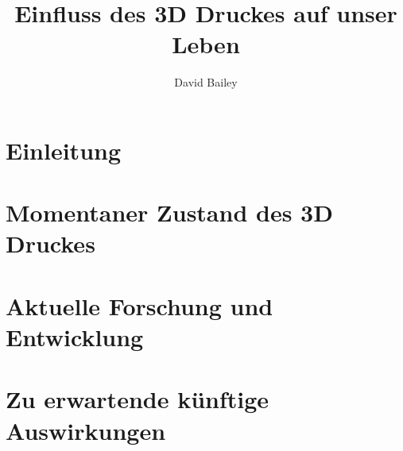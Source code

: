\documentclass[11pt,a4paper]{article}
\author{David Bailey}
\title{Einfluss des 3D Druckes auf unser Leben}
\begin{document}
\onehalfspacing



\pagestyle{empty}
\tableofcontents

\newpage
\pagestyle{plain}
\section{Einleitung}


\newpage
\section{Momentaner Zustand des 3D Druckes}


\newpage
\section{Aktuelle Forschung und Entwicklung}


\newpage
\section{Zu erwartende künftige Auswirkungen}



\newpage

\printbibliography[heading=bibintoc]

\newpage

\end{document}

